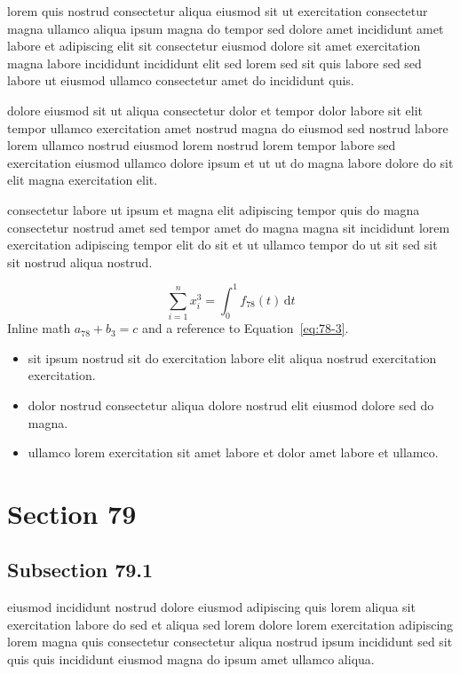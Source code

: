\documentclass{article}
\begin{document}
lorem quis nostrud consectetur aliqua eiusmod sit ut exercitation consectetur magna ullamco aliqua ipsum magna do tempor sed dolore amet incididunt amet labore et adipiscing elit sit consectetur eiusmod dolore sit amet exercitation magna labore incididunt incididunt elit sed lorem sed sit quis labore sed sed labore ut eiusmod ullamco consectetur amet do incididunt quis.

dolore eiusmod sit ut aliqua consectetur dolor et tempor dolor labore sit elit tempor ullamco exercitation amet nostrud magna do eiusmod sed nostrud labore lorem ullamco nostrud eiusmod lorem nostrud lorem tempor labore sed exercitation eiusmod ullamco dolore ipsum et ut ut do magna labore dolore do sit elit magna exercitation elit.

consectetur labore ut ipsum et magna elit adipiscing tempor quis do magna consectetur nostrud amet sed tempor amet do magna magna sit incididunt lorem exercitation adipiscing tempor elit do sit et ut ullamco tempor do ut sit sed sit sit nostrud aliqua nostrud.

\begin{equation}\label{eq:78-3}
  \sum_{i=1}^{n} x_i^{3} = \int_0^1 f_{78}(t)\,\mathrm{d}t
\end{equation}
Inline math $a_{78} + b_{3} = c$ and a reference to Equation~\eqref{eq:78-3}.

\begin{itemize}
  \item sit ipsum nostrud sit do exercitation labore elit aliqua nostrud exercitation exercitation.
  \item dolor nostrud consectetur aliqua dolore nostrud elit eiusmod dolore sed do magna.
  \item ullamco lorem exercitation sit amet labore et dolor amet labore et ullamco.
\end{itemize}

\section{Section 79}\label{sec:79}
\subsection{Subsection 79.1}\label{sec:79-1}
eiusmod incididunt nostrud dolore eiusmod adipiscing quis lorem aliqua sit exercitation labore do sed et aliqua sed lorem dolore lorem exercitation adipiscing lorem magna quis consectetur consectetur aliqua nostrud ipsum incididunt sed sit quis quis incididunt eiusmod magna do ipsum amet ullamco aliqua.
\end{document}
